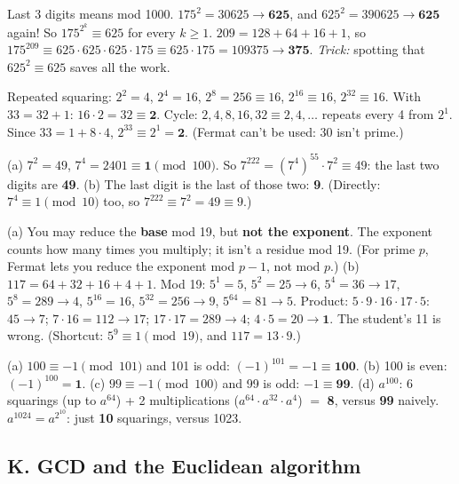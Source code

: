 \ans Last 3 digits means mod 1000. $175^2 = 30625 \to \mathbf{625}$, and $625^2 = 390625 \to \mathbf{625}$ again! So $175^{2^k} \equiv 625$ for every $k \ge 1$.
$209 = 128 + 64 + 16 + 1$, so $175^{209} \equiv 625 \cdot 625 \cdot 625 \cdot 175 \equiv 625 \cdot 175 = 109375 \to \mathbf{375}$.
\emph{Trick:} spotting that $625^2 \equiv 625$ saves all the work.

\ans Repeated squaring: $2^2 = 4$, $2^4 = 16$, $2^8 = 256 \equiv 16$, $2^{16} \equiv 16$, $2^{32} \equiv 16$. With $33 = 32 + 1$: $16 \cdot 2 = 32 \equiv \mathbf{2}$.
Cycle: $2, 4, 8, 16, 32 \equiv 2, 4, \dots$ repeats every 4 from $2^1$. Since $33 = 1 + 8\cdot4$, $2^{33} \equiv 2^1 = \mathbf{2}$.
(Fermat can't be used: 30 isn't prime.)

\ans (a) $7^2 = 49$, $7^4 = 2401 \equiv \mathbf{1} \pmod{100}$. So $7^{222} = (7^4)^{55}\cdot 7^2 \equiv 49$: the last two digits are \textbf{49}.
(b) The last digit is the last of those two: \textbf{9}. (Directly: $7^4 \equiv 1 \pmod{10}$ too, so $7^{222} \equiv 7^2 = 49 \equiv 9$.)

\ans (a) You may reduce the \textbf{base} mod 19, but \textbf{not the exponent}. The exponent counts how many times you multiply; it isn't a residue mod 19. (For prime $p$, Fermat lets you reduce the exponent mod $p - 1$, not mod $p$.)
(b) $117 = 64 + 32 + 16 + 4 + 1$. Mod 19: $5^1 = 5$, $5^2 = 25 \to 6$, $5^4 = 36 \to 17$, $5^8 = 289 \to 4$, $5^{16} = 16$, $5^{32} = 256 \to 9$, $5^{64} = 81 \to 5$.
Product: $5 \cdot 9 \cdot 16 \cdot 17 \cdot 5$: $45 \to 7$; $7\cdot16 = 112 \to 17$; $17\cdot17 = 289 \to 4$; $4 \cdot 5 = 20 \to \mathbf{1}$. The student's 11 is wrong.
(Shortcut: $5^9 \equiv 1 \pmod{19}$, and $117 = 13 \cdot 9$.)

\ans (a) $100 \equiv -1 \pmod{101}$ and 101 is odd: $(-1)^{101} = -1 \equiv \mathbf{100}$.
(b) 100 is even: $(-1)^{100} = \mathbf{1}$.
(c) $99 \equiv -1 \pmod{100}$ and 99 is odd: $-1 \equiv \mathbf{99}$.
(d) $a^{100}$: 6 squarings (up to $a^{64}$) + 2 multiplications ($a^{64}\cdot a^{32}\cdot a^4$) $=$ \textbf{8}, versus \textbf{99} naively.
$a^{1024} = a^{2^{10}}$: just \textbf{10} squarings, versus 1023.

\subsection*{K. GCD and the Euclidean algorithm}

